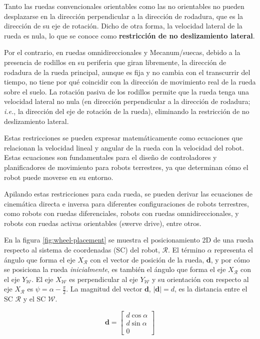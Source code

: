 \documentclass[11pt,a4paper]{article}
\newcommand{\vect}[1]{\bm{#1}}       %
\newcommand{\frameR}{\mathcal{R}}
\newcommand{\ejeXR}{X_{\frameR}}
\newcommand{\frameW}{\mathcal{W}}
\newcommand{\ejeXW}{X_{\frameW}}
\newcommand{\ejeYW}{Y_{\frameW}}
\begin{document}
Tanto las ruedas convencionales orientables como las no orientables no pueden desplazarse en la dirección perpendicular a la dirección de rodadura, que es la dirección de su eje de rotación. Dicho de otra forma, la velocidad lateral de la rueda es nula, lo que se conoce como \textbf{restricción de no deslizamiento lateral}.

Por el contrario, en ruedas omnidireccionales y Mecanum/suecas, debido a la presencia de rodillos en su periferia que giran libremente, la dirección de rodadura de la rueda principal, aunque es fija y no cambia con el transcurrir del tiempo, no tiene por qué coincidir con la dirección de movimiento real de la rueda sobre el suelo. La rotación pasiva de los rodillos permite que la rueda tenga una velocidad lateral no nula (en dirección perpendicular a la dirección de rodadura; \textit{i.e.}, la dirección del eje de rotación de la rueda), eliminando la restricción de no deslizamiento lateral.

Estas restricciones se pueden expresar matemáticamente como ecuaciones que relacionan la velocidad lineal y angular de la rueda con la velocidad del robot. Estas ecuaciones son fundamentales para el diseño de controladores y planificadores de movimiento para robots terrestres, ya que determinan cómo el robot puede moverse en su entorno.

Apilando estas restricciones para cada rueda, se pueden derivar las ecuaciones de cinemática directa e inversa para diferentes configuraciones de robots terrestres, como robots con ruedas diferenciales, robots con ruedas omnidireccionales, y robots con ruedas activas orientables (swerve drive), entre otros.

En la figura \ref{fig:wheel-placement} se muestra el posicionamiento 2D de una rueda respecto al sistema de coordenadas (SC) del robot, \(\frameR\).
El término \(\alpha\) representa el ángulo que forma el eje \(\ejeXR\) con el vector de posición de la rueda, \(\vect{d}\), y por cómo se posiciona la rueda \textit{inicialmente}, es también el ángulo que forma el eje \(\ejeXR\) con el eje \(\ejeYW\). El eje \(\ejeXW\) es perpendicular al eje \(\ejeYW\) y su orientación con respecto al eje \(\ejeXR\) es \(\psi = \alpha - \frac{\pi}{2}\).
La magnitud del vector \(\vect{d}\), \(\left|\bm{d}\right| = d\),  es la distancia entre el SC \(\frameR\) y el SC \(\frameW\).

\begin{equation}
    \vect{d} = \begin{bmatrix} d\cos\alpha \\ d\sin\alpha \\ 0 \end{bmatrix}
\end{equation}
\end{document}
